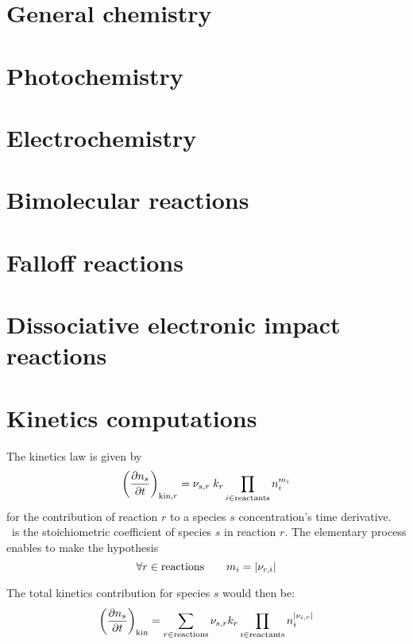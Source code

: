 \hfil%

\section{General chemistry}


\section[Titan_code_photochem]{Photochemistry}


\section{Electrochemistry}


\section[Titan_code_Antioch]{Bimolecular reactions}
\label{Titan_bimol_sec}


\section[Titan_code_Antioch]{Falloff reactions}


\section[Titan_code_Antioch]{Dissociative electronic impact reactions}


\section{Kinetics computations}
The kinetics law is given by
\begin{equation}
\left(\frac{\partial n_s}{\partial t}\right)_{\text{kin},r} = {\nu_{s,r}}\; k_{r} \prod_{i\in\text{reactants}}n_i^{{m_{i}}}
\end{equation}
for the contribution of reaction $r$ to a species $s$ concentration's
time derivative. \ is the stoichiometric coefficient of species
$s$ in reaction $r$. The elementary process enables to make the hypothesis
\begin{equation}
\forall r \in \text{reactions}\qquad
{m_{i}} = |{\nu_{r,i}}|
\end{equation}

The total kinetics contribution for species $s$ would then be:
\begin{equation}
\left(\frac{\partial n_s}{\partial t}\right)_\text{kin} = \sum_{r\in \text{reactions}} {\nu_{s,r}} k_{r} \prod_{i\in\text{reactants}}n_i^{|{\nu_{i,r}}|}
\label{Titan:kinetics}
\end{equation}
